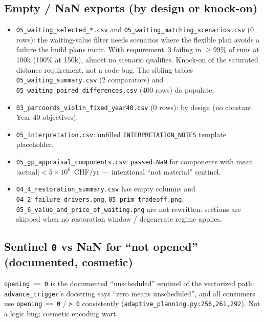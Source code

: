 \documentclass[11pt,a4paper]{article}
\begin{document}
\subsection{Empty / NaN exports (by design or knock-on)}
\begin{itemize}
  \item \texttt{05\_waiting\_selected\_*.csv} and \texttt{05\_waiting\_matching\_scenarios.csv}
        (0 rows): the waiting-value filter needs scenarios where the flexible plan avoids a
        failure the build plans incur. With requirement~3 failing in $\geq$99\% of runs at
        100k (100\% at 150k), almost no scenario qualifies. Knock-on of the saturated
        distance requirement, not a code bug. The sibling tables
        \texttt{05\_waiting\_summary.csv} (2 comparators) and
        \texttt{05\_waiting\_paired\_differences.csv} (400 rows) do populate.
  \item \texttt{03\_parcoords\_violin\_fixed\_year40.csv} (0 rows): by design
        (no constant Year-40 objectives).
  \item \texttt{05\_interpretation.csv}: unfilled \texttt{INTERPRETATION\_NOTES}
        template placeholder.
  \item \texttt{05\_gp\_appraisal\_components.csv}: \texttt{passed=NaN} for components
        with mean $|\text{actual}| < 5\times10^6$~CHF/yr --- intentional
        ``not material'' sentinel.
  \item \texttt{04\_4\_restoration\_summary.csv} has empty columns and
        \texttt{04\_2\_failure\_drivers.png}, \texttt{05\_prim\_tradeoff.png},
        \texttt{05\_6\_value\_and\_price\_of\_waiting.png} are not rewritten:
        sections are skipped when no restoration window / degenerate regime applies.
\end{itemize}

\subsection{Sentinel \texttt{0} vs NaN for ``not opened'' (documented, cosmetic)}
\texttt{opening == 0} is the documented ``unscheduled'' sentinel of the vectorized
path: \texttt{advance\_trigger}'s docstring says ``zero means unscheduled'', and all
consumers use \texttt{opening == 0} / \texttt{> 0} consistently
(\texttt{adaptive\_planning.py:256,261,292}). Not a logic bug; cosmetic encoding wart.
\end{document}
